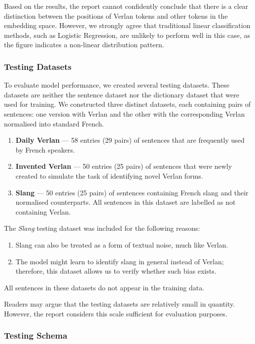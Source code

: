 \documentclass[12pt]{article}
\begin{document}
Based on the results, the report cannot confidently conclude that there is a clear distinction between the positions of Verlan tokens and other tokens in the embedding space. 
However, we strongly agree that traditional linear classification methods, such as Logistic Regression, are unlikely to perform well in this case, as the figure indicates a non-linear distribution pattern.

\subsubsection{Testing Datasets}
To evaluate model performance, we created several testing datasets. 
These datasets are neither the sentence dataset nor the dictionary dataset that were used for training. 
We constructed three distinct datasets, each containing pairs of sentences: one version with Verlan and the other with the corresponding Verlan normalised into standard French.

\begin{enumerate}
\item \textbf{Daily Verlan} --- 58 entries (29 pairs) of sentences that are frequently used by French speakers.
  \item \textbf{Invented Verlan} --- 50 entries (25 pairs) of sentences that were newly created to simulate the task of identifying novel Verlan forms.
  \item \textbf{Slang} --- 50 entries (25 pairs) of sentences containing French slang and their normalised counterparts. All sentences in this dataset are labelled as not containing Verlan.
\end{enumerate}

The \textit{Slang} testing dataset was included for the following reasons:
\begin{enumerate}
  \item Slang can also be treated as a form of textual noise, much like Verlan.
  \item The model might learn to identify slang in general instead of Verlan; therefore, this dataset allows us to verify whether such bias exists.
\end{enumerate}

All sentences in these datasets do not appear in the training data.

Readers may argue that the testing datasets are relatively small in quantity. 
However, the report considers this scale sufficient for evaluation purposes.

\subsubsection{Testing Schema}
\end{document}

